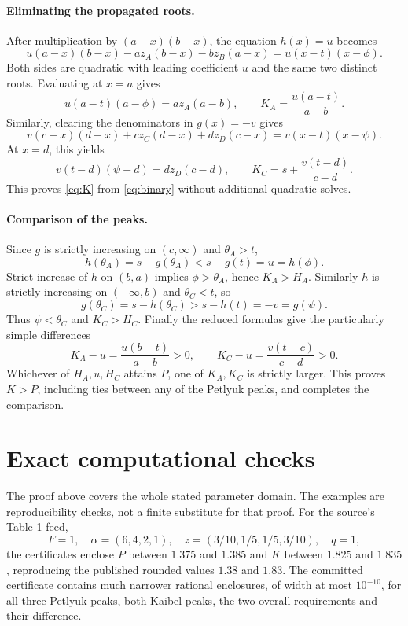 \documentclass[11pt,a4paper]{report}
\begin{document}
\paragraph{Eliminating the propagated roots.}
After multiplication by \((a-x)(b-x)\), the equation \(h(x)=u\) becomes
\[
 u(a-x)(b-x)-az_A(b-x)-bz_B(a-x)=u(x-t)(x-\phi).
\]
Both sides are quadratic with leading coefficient \(u\) and the same
two distinct roots. Evaluating at \(x=a\) gives
\[
 u(a-t)(a-\phi)=az_A(a-b),\qquad
 K_A=\frac{u(a-t)}{a-b}.
\]
Similarly, clearing the denominators in \(g(x)=-v\) gives
\[
 v(c-x)(d-x)+cz_C(d-x)+dz_D(c-x)=v(x-t)(x-\psi).
\]
At \(x=d\), this yields
\[
 v(t-d)(\psi-d)=dz_D(c-d),\qquad
 K_C=s+\frac{v(t-d)}{c-d}.
\]
This proves \eqref{eq:K} from \eqref{eq:binary} without additional
quadratic solves.

\paragraph{Comparison of the peaks.}
Since \(g\) is strictly increasing on \((c,\infty)\) and
\(\theta_A>t\),
\[
 h(\theta_A)=s-g(\theta_A)<s-g(t)=u=h(\phi).
\]
Strict increase of \(h\) on \((b,a)\) implies
\(\phi>\theta_A\), hence \(K_A>H_A\).
Similarly \(h\) is strictly increasing on \((-\infty,b)\) and
\(\theta_C<t\), so
\[
 g(\theta_C)=s-h(\theta_C)>s-h(t)=-v=g(\psi).
\]
Thus \(\psi<\theta_C\) and \(K_C>H_C\).
Finally the reduced formulas give the particularly simple differences
\begin{equation}\label{eq:strict}
 K_A-u=\frac{u(b-t)}{a-b}>0,\qquad
 K_C-u=\frac{v(t-c)}{c-d}>0.
\end{equation}
Whichever of \(H_A,u,H_C\) attains \(P\), one of \(K_A,K_C\)
is strictly larger. This proves \(K>P\), including ties between any
of the Petlyuk peaks, and completes the comparison.

\section{Exact computational checks}
The proof above covers the whole stated parameter domain. The examples
are reproducibility checks, not a finite substitute for that proof.
For the source's Table 1 feed,
\[
 F=1,\quad \alpha=(6,4,2,1),\quad
 z=(3/10,1/5,1/5,3/10),\quad q=1,
\]
the certificates enclose \(P\) between \(1.375\) and \(1.385\)
and \(K\) between \(1.825\) and \(1.835\), reproducing the published
rounded values \(1.38\) and \(1.83\).
The committed certificate contains much narrower rational enclosures,
of width at most \(10^{-10}\), for all three Petlyuk peaks, both
Kaibel peaks, the two overall requirements and their difference.
\end{document}

